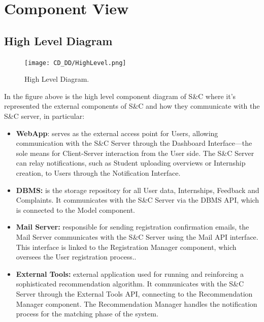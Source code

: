 \section{Component View}
\label{sec:component_view}%

\subsection{High Level Diagram}
\label{subsec:high_level_diagram}%

\begin{figure}[H]
    \begin{center}
        \texttt{[image: CD\_DD/HighLevel.png]}
        \caption{High Level Diagram.}
        \label{fig:high_level_diagram}%
    \end{center}
\end{figure}

\noindent In the figure above is the high level component diagram of S\&C where it’s represented the external components of S\&C and how they communicate with the S\&C server, in particular:
\begin{itemize}
    \item \textbf{WebApp}: serves as the external access point for Users, allowing communication with the S\&C Server through the Dashboard Interface—the sole means for Client-Server interaction from the User side. The S\&C Server can relay notifications, such as Student uploading overviews or Internship creation, to Users through the Notification Interface.
    \item \textbf{DBMS:} is the storage repository for all User data, Internships, Feedback and Complaints. It communicates with the S\&C Server via the DBMS API, which is connected to the Model component.
    \item \textbf{Mail Server:} responsible for sending registration confirmation emails, the Mail Server communicates with the S\&C Server using the Mail API interface. This interface is linked to the Registration Manager component, which oversees the User registration process..
    \item \textbf{External Tools:} external application used for running and reinforcing a sophisticated recommendation algorithm. It communicates with the S\&C Server through the External Tools API, connecting to the Recommendation Manager component. The Recommendation Manager handles the notification process for the matching phase of the system.
\end{itemize}

